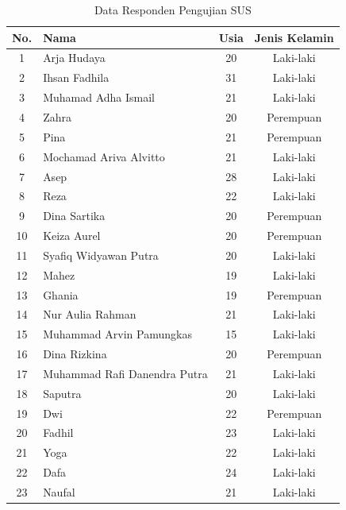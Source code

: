 \begin{table}[H]
  \centering
  \caption{Data Responden Pengujian SUS}
  \label{tab:sus-responden}
  \begin{tabular}{|c|l|c|c|}
    \hline
    No. & Nama & Usia & Jenis Kelamin \\
    \hline
    1  & Arja Hudaya             & 20 & Laki-laki \\ \hline
    2  & Ihsan Fadhila           & 31 & Laki-laki \\ \hline
    3  & Muhamad Adha Ismail     & 21 & Laki-laki \\ \hline
    4  & Zahra                   & 20 & Perempuan \\ \hline
    5  & Pina                    & 21 & Perempuan \\ \hline
    6  & Mochamad Ariva Alvitto  & 21 & Laki-laki \\ \hline
    7  & Asep                    & 28 & Laki-laki \\ \hline
    8  & Reza                    & 22 & Laki-laki \\ \hline
    9  & Dina Sartika            & 20 & Perempuan \\ \hline
    10 & Keiza Aurel             & 20 & Perempuan \\ \hline
    11 & Syafiq Widyawan Putra   & 20 & Laki-laki \\ \hline
    12 & Mahez                   & 19 & Laki-laki \\ \hline
    13 & Ghania                  & 19 & Perempuan \\ \hline
    14 & Nur Aulia Rahman        & 21 & Laki-laki \\ \hline
    15 & Muhammad Arvin Pamungkas & 15 & Laki-laki \\ \hline
    16 & Dina Rizkina            & 20 & Perempuan \\ \hline
    17 & Muhammad Rafi Danendra Putra & 21 & Laki-laki \\ \hline
    18 & Saputra                 & 20 & Laki-laki \\ \hline
    19 & Dwi                     & 22 & Perempuan \\ \hline
    20 & Fadhil                  & 23 & Laki-laki \\ \hline
    21 & Yoga                    & 22 & Laki-laki \\ \hline
    22 & Dafa                    & 24 & Laki-laki \\ \hline
    23 & Naufal                  & 21 & Laki-laki \\ \hline
  \end{tabular}
\end{table}

